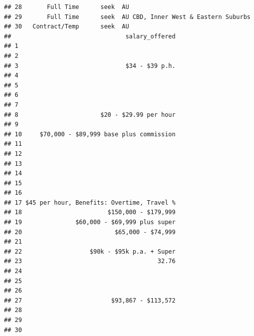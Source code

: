 \documentclass[11pt,a4paper,]{article}
\begin{document}
\begin{verbatim}
## 28       Full Time      seek  AU                                  
## 29       Full Time      seek  AU CBD, Inner West & Eastern Suburbs
## 30   Contract/Temp      seek  AU                                  
##                                salary_offered
## 1                                            
## 2                                            
## 3                              $34 - $39 p.h.
## 4                                            
## 5                                            
## 6                                            
## 7                                            
## 8                       $20 - $29.99 per hour
## 9                                            
## 10     $70,000 - $89,999 base plus commission
## 11                                           
## 12                                           
## 13                                           
## 14                                           
## 15                                           
## 16                                           
## 17 $45 per hour, Benefits: Overtime, Travel %
## 18                        $150,000 - $179,999
## 19               $60,000 - $69,999 plus super
## 20                          $65,000 - $74,999
## 21                                           
## 22                   $90k - $95k p.a. + Super
## 23                                      32.76
## 24                                           
## 25                                           
## 26                                           
## 27                         $93,867 - $113,572
## 28                                           
## 29                                           
## 30
\end{verbatim}
\end{document}
